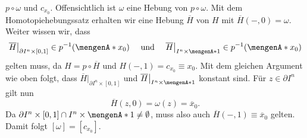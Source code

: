 \begin{description}
	$p \circ \omega$ und $c_{x_0}$. Offensichtlich ist $\omega$ eine Hebung von $p \circ \omega$. Mit dem Homotopiehebungssatz erhalten wir eine Hebung $\overline{H}$ von
	$H$ mit $\overline{H}(-,0) = \omega$. Weiter wissen wir, dass
	\[
		\overline{H} \big|_{\partial I^n \times [0,1]} \in p ^{-1}(\set{x_0} ) \quad \text{ und }\quad  \overline{H} \big|_{ I^n \times \set{1}} \in p ^{-1}(\set{x_0} )
	\]
	gelten muss, da $H = p \circ \overline{H}$ und $H(-,1)= c_{x_0} \equiv x_0$. Mit dem gleichen Argument wie oben folgt, dass 
	$\overline{H} \big|_{\partial I^n \times [0,1]}$ und $\overline{H} \big|_{ I^n \times \set{1}}$ konstant sind. Für $z \in \partial I^n$ gilt nun
	\[
		\overline{H}(z,0) = \omega(z) = \overline{x}_0.  
	\]
	Da $\partial I^n \times [0,1] \cap I^n \times \set{1} \not= \emptyset$, muss also auch $\overline{H}(-,1) \equiv \overline{x}_0$ gelten. Damit folgt
	$[\omega] = [c_{x_0}]$. \bewende
\end{description}
\newpage
{}
\setcounter{page}{1}
\printindex
\listoffigures
\todototoc
{}

